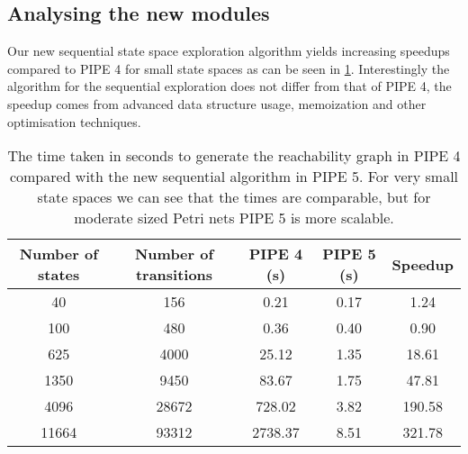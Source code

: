 \subsection{Analysing the new modules}
Our new sequential state space exploration algorithm  yields increasing speedups compared to PIPE 4 for small state spaces as can be seen in \cref{tbl:pipe5_vs_pipe4_sequential}. Interestingly the algorithm for the sequential exploration does not differ from that of PIPE 4, the speedup comes from advanced data structure usage, memoization and other optimisation techniques.

\begin{table}[tb]
\begin{center}
  \begin{tabular}{| c | c | c | c | c | }
  \hline
    Number of states & Number of transitions & PIPE 4 (s) & PIPE 5 (s) & Speedup \\
    \hline
    40 & 156 & 0.21 & 0.17 & 1.24\\
    \hline
    100 & 480 & 0.36 & 0.40 & 0.90\\
    \hline
    625 & 4000 & 25.12 & 1.35 & 18.61\\
    \hline
    1350 & 9450 & 83.67 & 1.75 & 47.81\\
    \hline
    4096 & 28672 & 728.02 & 3.82 & 190.58\\
    \hline
    11664 & 93312 & 2738.37 & 8.51 & 321.78\\
    \hline
  \end{tabular}
\caption{The time taken in seconds to generate the reachability graph in PIPE 4 compared with the new sequential algorithm in PIPE 5. For very small state spaces we can see that the times are comparable, but for moderate sized Petri nets PIPE 5 is more scalable.}
\label{tbl:pipe5_vs_pipe4_sequential}
\end{center}
\end{table}


